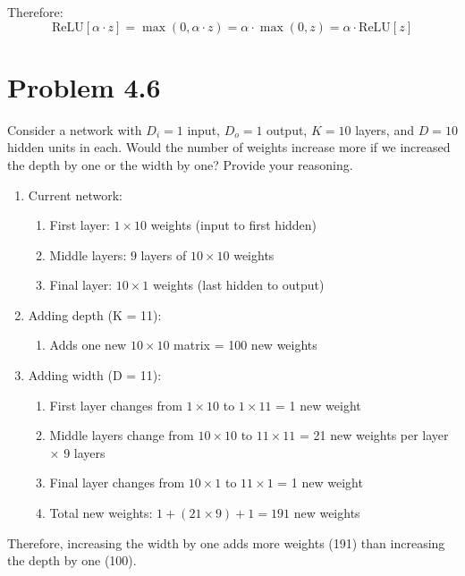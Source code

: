\documentclass[10pt]{article}
\begin{document}
Therefore:
\[ \text{ReLU}[\alpha \cdot z] = \max(0, \alpha \cdot z) = \alpha \cdot \max(0, z) = \alpha \cdot \text{ReLU}[z] \]

\vspace{2em}

\section*{Problem 4.6}
Consider a network with $D_i = 1$ input, $D_o = 1$ output, $K = 10$ layers, and $D = 10$ hidden units in each. Would the number of weights increase more \textemdash{} if we increased the depth by one or the width by one? Provide your reasoning.

\vspace{1em}

\begin{enumerate}
    \item Current network:
    \begin{enumerate}
        \item First layer: $1 \times 10$ weights (input to first hidden)
        \item Middle layers: $9$ layers of $10 \times 10$ weights
        \item Final layer: $10 \times 1$ weights (last hidden to output)
    \end{enumerate}
    \item Adding depth (K = 11):
    \begin{enumerate}
        \item Adds one new $10 \times 10$ matrix = 100 new weights
    \end{enumerate}
    \item Adding width (D = 11):
    \begin{enumerate}
        \item First layer changes from $1 \times 10$ to $1 \times 11$ = 1 new weight
        \item Middle layers change from $10 \times 10$ to $11 \times 11$ = 21 new weights per layer × 9 layers
        \item Final layer changes from $10 \times 1$ to $11 \times 1$ = 1 new weight
        \item Total new weights: $1 + (21 \times 9) + 1 = 191$ new weights
    \end{enumerate}
\end{enumerate}

Therefore, increasing the width by one adds more weights (191) than increasing the depth by one (100).
\end{document}
